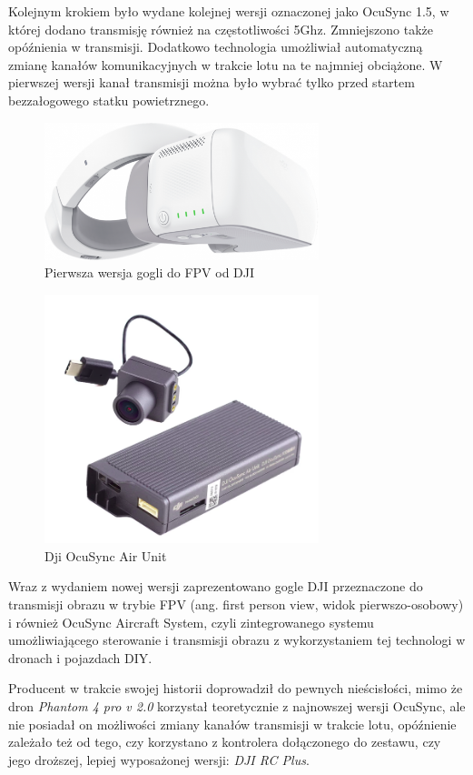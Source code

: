 \documentclass[12pt, a4paper, twoside]{report}
\begin{document}
\hspace{1cm}Kolejnym krokiem było wydane kolejnej wersji oznaczonej jako OcuSync 1.5, w której dodano transmisję również na częstotliwości 5Ghz. Zmniejszono także opóźnienia w transmisji. Dodatkowo technologia umożliwiał automatyczną zmianę kanałów komunikacyjnych w trakcie lotu na te najmniej obciążone. W pierwszej wersji kanał 
transmisji można było wybrać tylko przed startem bezzałogowego statku powietrznego.


\begin{figure}[!ht]
  \centering
  \includegraphics[width=8cm]{Obrazy/dji-google.png}
  \caption{Pierwsza wersja gogli do FPV od DJI \cite{dji-gogle}}
  \end{figure}
  

\begin{figure}[!ht]
  \centering
  \includegraphics[width=8cm]{Obrazy/dji-air-unit.png}
  \caption{Dji OcuSync Air Unit\cite{dji-store}}
  \end{figure}
  

\hspace{1cm}Wraz z wydaniem nowej wersji zaprezentowano gogle DJI przeznaczone do transmisji obrazu w trybie FPV (ang. first person view, widok pierwszo-osobowy) i również OcuSync Aircraft System, czyli zintegrowanego systemu umożliwiającego sterowanie i transmisji obrazu z wykorzystaniem tej technologi w dronach i pojazdach DIY.

\hspace{1cm}Producent w trakcie swojej historii doprowadził do pewnych nieścisłości, mimo że dron \emph{Phantom 4 pro v 2.0} korzystał teoretycznie z najnowszej wersji OcuSync, ale nie posiadał on możliwości zmiany kanałów transmisji w trakcie lotu, opóźnienie zależało też od tego, czy korzystano z kontrolera dołączonego do zestawu, czy jego droższej, lepiej wyposażonej wersji: \emph{DJI RC Plus}.
  
\end{document}
